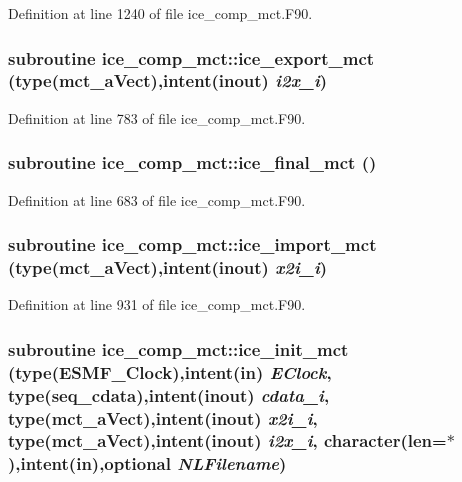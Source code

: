 Definition at line 1240 of file ice\_\-comp\_\-mct.F90.\hypertarget{namespaceice__comp__mct_a0b623ba08317afe1cf24e68494b092da}{
\subsubsection[{ice\_\-export\_\-mct}]{\setlength{\rightskip}{0pt plus 5cm}subroutine ice\_\-comp\_\-mct::ice\_\-export\_\-mct (type(mct\_\-aVect),intent(inout) {\em i2x\_\-i})}}
\label{namespaceice__comp__mct_a0b623ba08317afe1cf24e68494b092da}


Definition at line 783 of file ice\_\-comp\_\-mct.F90.\hypertarget{namespaceice__comp__mct_acd10abc7ef002e1d5e3223ce079bad2b}{
\subsubsection[{ice\_\-final\_\-mct}]{\setlength{\rightskip}{0pt plus 5cm}subroutine ice\_\-comp\_\-mct::ice\_\-final\_\-mct ()}}
\label{namespaceice__comp__mct_acd10abc7ef002e1d5e3223ce079bad2b}


Definition at line 683 of file ice\_\-comp\_\-mct.F90.\hypertarget{namespaceice__comp__mct_a64a861144b6d897f984676031622b7f9}{
\subsubsection[{ice\_\-import\_\-mct}]{\setlength{\rightskip}{0pt plus 5cm}subroutine ice\_\-comp\_\-mct::ice\_\-import\_\-mct (type(mct\_\-aVect),intent(inout) {\em x2i\_\-i})}}
\label{namespaceice__comp__mct_a64a861144b6d897f984676031622b7f9}


Definition at line 931 of file ice\_\-comp\_\-mct.F90.\hypertarget{namespaceice__comp__mct_aea0306f80417faf23e2153503a468ed0}{
\subsubsection[{ice\_\-init\_\-mct}]{\setlength{\rightskip}{0pt plus 5cm}subroutine ice\_\-comp\_\-mct::ice\_\-init\_\-mct (type(ESMF\_\-Clock),intent(in) {\em EClock}, \/  type(seq\_\-cdata),intent(inout) {\em cdata\_\-i}, \/  type(mct\_\-aVect),intent(inout) {\em x2i\_\-i}, \/  type(mct\_\-aVect),intent(inout) {\em i2x\_\-i}, \/  character(len=$\ast$),intent(in),optional {\em NLFilename})}}
\label{namespaceice__comp__mct_aea0306f80417faf23e2153503a468ed0}


